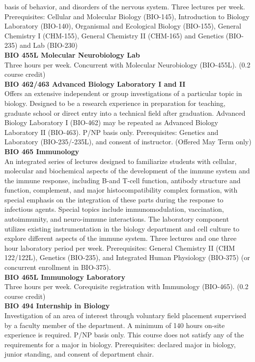 \documentclass[
  letterpaper,
]{scrbook}
\begin{document}
basis of behavior, and disorders of the nervous system. Three lectures
per week. Prerequisites: Cellular and Molecular Biology (BIO-145),
Introduction to Biology Laboratory (BIO-140), Organismal and Ecological
Biology (BIO-155), General Chemistry I (CHM-155), General Chemistry II
(CHM-165) and Genetics (BIO-235) and Lab (BIO-230)\\
\textbf{BIO 455L Molecular Neurobiology Lab}\\
Three hours per week. Concurrent with Molecular Neurobiology (BIO-455L).
(0.2 course credit)\\
\textbf{BIO 462/463 Advanced Biology Laboratory I and II}\\
Offers an extensive independent or group investigations of a particular
topic in biology. Designed to be a research experience in preparation
for teaching, graduate school or direct entry into a technical field
after graduation. Advanced Biology Laboratory I (BIO-462) may be
repeated as Advanced Biology Laboratory II (BIO-463). P/NP basis only.
Prerequisites: Genetics and Laboratory (BIO-235/-235L), and consent of
instructor. (Offered May Term only)\\
\textbf{BIO 465 Immunology}\\
An integrated series of lectures designed to familiarize students with
cellular, molecular and biochemical aspects of the development of the
immune system and the immune response, including B-and T-cell function,
antibody structure and function, complement, and major
histocompatibility complex formation, with special emphasis on the
integration of these parts during the response to infectious agents.
Special topics include immunomodulation, vaccination, autoimmunity, and
neuro-immune interactions. The laboratory component utilizes existing
instrumentation in the biology department and cell culture to explore
different aspects of the immune system. Three lectures and one three
hour laboratory period per week. Prerequisites: General Chemistry II
(CHM 122/122L), Genetics (BIO-235), and Integrated Human Physiology
(BIO-375) (or concurrent enrollment in BIO-375).\\
\textbf{BIO 465L Immunology Laboratory}\\
Three hours per week. Corequisite registration with Immunology
(BIO-465). (0.2 course credit)\\
\textbf{BIO 494 Internship in Biology}\\
Investigation of an area of interest through voluntary field placement
supervised by a faculty member of the department. A minimum of 140 hours
on-site experience is required. P/NP basis only. This course does not
satisfy any of the requirements for a major in biology. Prerequisites:
declared major in biology, junior standing, and consent of department
chair.
\end{document}
